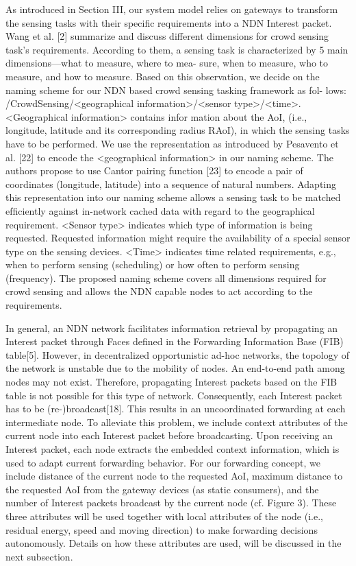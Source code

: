 \documentclass[10pt, conference, compsocconf]{IEEEtran}
\begin{document}
As introduced in Section III, our system model relies on gateways to transform the sensing tasks with their speciﬁc requirements into a NDN Interest packet. Wang et al. [2] summarize and discuss different dimensions for crowd sensing task’s requirements. According to them, a sensing task is characterized by 5 main dimensions—what to measure, where to mea- sure, when to measure, who to measure, and how to measure. Based on this observation, we decide on the naming scheme for our NDN based crowd sensing tasking framework as fol- lows: /CrowdSensing/<geographical information>/<sensor type>/<time>. <Geographical information> contains infor mation about the AoI, (i.e., longitude, latitude and its corresponding radius RAoI), in which  the  sensing  tasks  have  to be performed. We use the representation as introduced by Pesavento et al. [22] to encode the <geographical information> in our naming scheme. The authors propose to use Cantor pairing function [23] to encode a pair of coordinates (longitude, latitude) into a sequence of natural numbers. Adapting this representation into our naming scheme allows a sensing task to be matched efﬁciently against in-network cached data with regard to the geographical requirement. <Sensor type> indicates which type of information is being requested. Requested information might require the availability of a special sensor type on the sensing devices. <Time> indicates time related requirements, e.g., when to perform sensing (scheduling) or how often to perform sensing (frequency). The proposed naming scheme covers all dimensions required for crowd sensing and allows the NDN capable nodes to act according to the requirements.

In general, an NDN network facilitates information retrieval by propagating an Interest packet through Faces deﬁned in the Forwarding Information Base (FIB) table[5]. However,   in decentralized opportunistic ad-hoc networks, the topology of the network is unstable  due  to  the  mobility  of  nodes.  An end-to-end path among nodes may not exist. Therefore, propagating Interest packets based on the FIB table is not possible for this type of network. Consequently, each Interest packet has to be  (re-)broadcast[18].  This  results  in an uncoordinated forwarding at each intermediate node. To alleviate this problem, we include context attributes of the current node into each Interest packet before broadcasting. Upon receiving an Interest packet, each node extracts the embedded context information, which is used to adapt current forwarding behavior. For our forwarding concept, we include distance of the current node to the requested AoI, maximum distance to the requested AoI from the gateway devices (as static consumers), and the number of Interest packets broadcast by the current node (cf. Figure 3). These three attributes will be used together with local attributes of the node (i.e., residual energy, speed and moving direction) to make forwarding decisions autonomously. Details on how these attributes are used, will be discussed in the next subsection.
\end{document}
